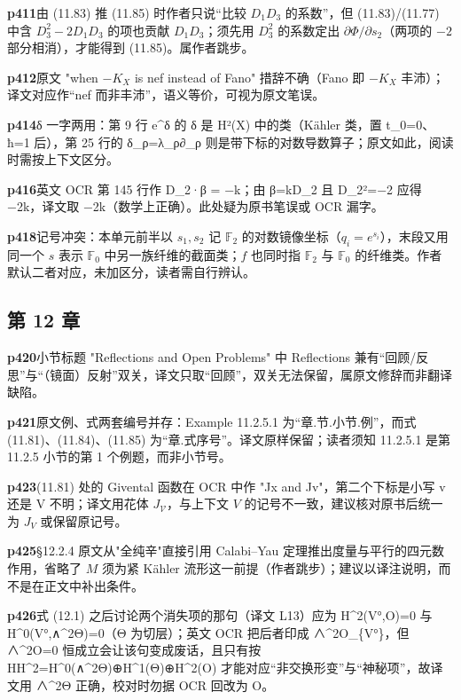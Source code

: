 \noindent\textbf{\footnotesize p411}\quad 由 (11.83) 推 (11.85) 时作者只说“比较 $D_1D_3$ 的系数”，但 (11.83)/(11.77) 中含 $D_3^2-2D_1D_3$ 的项也贡献 $D_1D_3$；须先用 $D_3^2$ 的系数定出 $\partial\Phi/\partial s_2$（两项的 $-2$ 部分相消），才能得到 (11.85)。属作者跳步。

\noindent\textbf{\footnotesize p412}\quad 原文 "when $-K_X$ is nef instead of Fano" 措辞不确（Fano 即 $-K_X$ 丰沛）；译文对应作“nef 而非丰沛”，语义等价，可视为原文笔误。

\noindent\textbf{\footnotesize p414}\quad δ 一字两用：第 9 行 e\^{}δ 的 δ 是 H²(X) 中的类（Kähler 类，置 t\_0=0、ħ=1 后），第 25 行的 δ\_ρ=λ\_ρ∂\_ρ 则是带下标的对数导数算子；原文如此，阅读时需按上下文区分。

\noindent\textbf{\footnotesize p416}\quad 英文 OCR 第 145 行作 D\_2·β = −k；由 β=kD\_2 且 D\_2²=−2 应得 −2k，译文取 −2k（数学上正确）。此处疑为原书笔误或 OCR 漏字。

\noindent\textbf{\footnotesize p418}\quad 记号冲突：本单元前半以 $s_1,s_2$ 记 $\mathbb F_2$ 的对数镜像坐标（$q_i=e^{s_i}$），末段又用同一个 $s$ 表示 $\mathbb F_0$ 中另一族纤维的截面类；$f$ 也同时指 $\mathbb F_2$ 与 $\mathbb F_0$ 的纤维类。作者默认二者对应，未加区分，读者需自行辨认。


\subsection*{第 12 章}

\noindent\textbf{\footnotesize p420}\quad 小节标题 "Reflections and Open Problems" 中 Reflections 兼有“回顾/反思”与“（镜面）反射”双关，译文只取“回顾”，双关无法保留，属原文修辞而非翻译缺陷。

\noindent\textbf{\footnotesize p421}\quad 原文例、式两套编号并存：Example 11.2.5.1 为“章.节.小节.例”，而式 (11.81)、(11.84)、(11.85) 为“章.式序号”。译文原样保留；读者须知 11.2.5.1 是第 11.2.5 小节的第 1 个例题，而非小节号。

\noindent\textbf{\footnotesize p423}\quad (11.81) 处的 Givental 函数在 OCR 中作 "Jx and Jv"，第二个下标是小写 v 还是 V 不明；译文用花体 $J_{\mathcal V}$，与上下文 $V$ 的记号不一致，建议核对原书后统一为 $J_V$ 或保留原记号。

\noindent\textbf{\footnotesize p425}\quad §12.2.4 原文从"全纯辛"直接引用 Calabi--Yau 定理推出度量与平行的四元数作用，省略了 $M$ 须为紧 Kähler 流形这一前提（作者跳步）；建议以译注说明，而不是在正文中补出条件。

\noindent\textbf{\footnotesize p426}\quad 式 (12.1) 之后讨论两个消失项的那句（译文 L13）应为 H\^{}2(V°,O)=0 与 H\^{}0(V°,∧\^{}2Θ)=0（Θ 为切层）；英文 OCR 把后者印成 ∧\^{}2O\_\{V°\}，但 ∧\^{}2O=0 恒成立会让该句变成废话，且只有按 HH\^{}2=H\^{}0(∧\^{}2Θ)⊕H\^{}1(Θ)⊕H\^{}2(O) 才能对应“非交换形变”与“神秘项”，故译文用 ∧\^{}2Θ 正确，校对时勿据 OCR 回改为 O。

